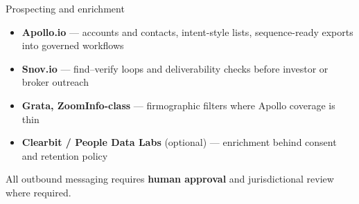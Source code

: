 \documentclass[aspectratio=169,11pt]{beamer}
\begin{document}
\begin{frame}{Prospecting and enrichment}
  \small
  \begin{itemize}
    \item \textbf{Apollo.io} --- accounts and contacts, intent-style lists, sequence-ready exports into governed workflows
    \item \textbf{Snov.io} --- find--verify loops and deliverability checks before investor or broker outreach
    \item \textbf{Grata, ZoomInfo-class} --- firmographic filters where Apollo coverage is thin
    \item \textbf{Clearbit / People Data Labs} (optional) --- enrichment behind consent and retention policy
  \end{itemize}
  All outbound messaging requires \textbf{human approval} and jurisdictional review where required.
\end{frame}
\end{document}
